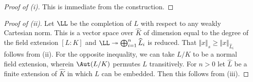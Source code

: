 \begin{proof}[Proof of (i)]
    This is immediate from the construction. 
\end{proof}
\begin{proof}[Proof of (ii)]
    Let $\LL$ be the completion of $L$ with respect to any weakly Cartesian norm. This is a vector space over $\widehat{K}$ of dimension equal to the degree of the field extension $[L:K]$ and $\LL\twoheadrightarrow\bigoplus_{i=1}^{n}\widehat{L}_{i}$ is reduced. That $\Vert x\Vert_{s}\geq\Vert x\Vert_{\widehat{L}_{i}}$ follows from  (ii). For the opposite inequality, we can take $L/K$ to be a normal field extension, wherein $\Aut(L/K)$ permutes $L$ transitively. For $n>0$ let $\widehat{L}$ be a finite extension of $\widehat{K}$ in which $L$ can be embedded. Then this follows from  (iii). 
\end{proof}
